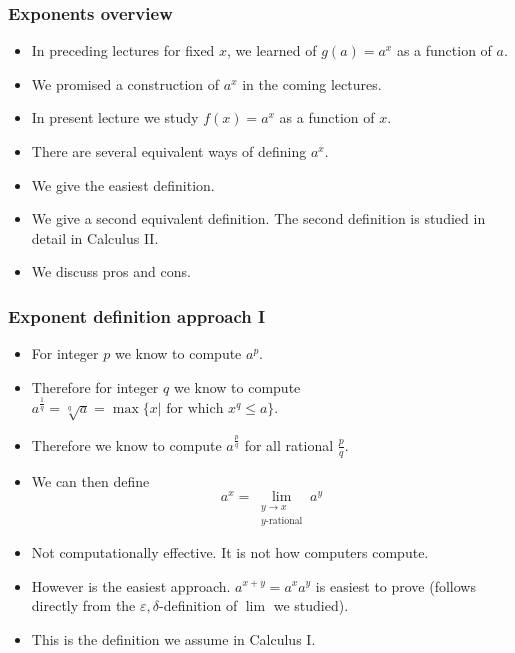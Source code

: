 \begin{frame}
\frametitle{Exponents overview}
\begin{itemize}
\item<1-> In preceding lectures for fixed $x$, we learned of $g(a) =a^{x}$ as a function of $a$.
\item<2-> We promised a construction of $a^x$ in the coming lectures.
\item<3-> In present lecture we study $f(x)=a^x$ as a function of $x$.
\item<4-> There are several equivalent ways of defining $a^x$. 
\item<5-> We give the easiest definition. 
\item<6->We give a second equivalent definition. The second definition is studied in detail in Calculus II. 
\item<7->We discuss pros and cons.
\end{itemize}
\end{frame}
\begin{frame}
\frametitle{Exponent definition approach I}
\begin{itemize}
\item<1-> For integer $p$ we know to compute $a^p$.
\item<2-> Therefore for integer $q$ we know to compute $a^{\frac{1}{q}}= \sqrt[q]{a}=\max\{x|\text{~for~which~} x^q\leq a\}$.
\item<3-> Therefore we know to compute $a^{\frac{p}{q}}$ for all rational $\frac{p}{q}$.
\item<4-> We can then define
\[
a^x = \lim\limits_{\substack{y \to x \\ y\text{-rational}}} a^y 
\]
\item<5-> Not computationally effective. It is not how computers compute.
\item<6-> However is the easiest approach. $a^{x+y}=a^xa^y$ is easiest to prove (follows directly from the $\varepsilon, \delta$-definition of $\lim$ we studied).
\item<7->\alert<7->{This is the definition we assume in Calculus I.}
\end{itemize}
\end{frame}
